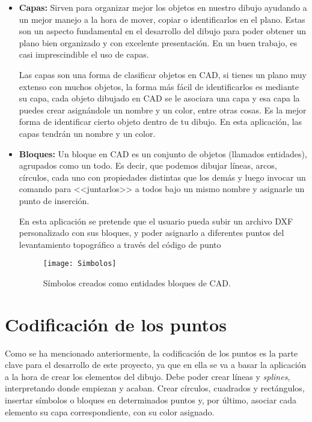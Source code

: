 \begin{itemize}

\item\textbf{Capas:} Sirven para organizar mejor los objetos en nuestro dibujo ayudando a un mejor manejo a la hora de mover, copiar o identificarlos en el plano. Estas son un aspecto fundamental en el desarrollo del dibujo para poder obtener un plano bien organizado y con excelente presentación. En un buen trabajo, es casi imprescindible el uso de capas.

Las capas son una forma de clasificar objetos en CAD, si tienes un plano muy extenso con muchos objetos, la forma más fácil de identificarlos es mediante su capa, cada objeto dibujado en CAD se le asociara una capa y esa capa la puedes crear asignándole un nombre y un color, entre otras cosas. Es la mejor forma de identificar cierto objeto dentro de tu dibujo.
En esta aplicación, las capas tendrán un nombre y un color.


\item\textbf{Bloques:} Un bloque en CAD es un conjunto de objetos (llamados entidades), agrupados como un todo. Es decir, que podemos dibujar líneas, arcos, círculos, cada uno con propiedades distintas que los demás y luego invocar un comando para <<juntarlos>> a todos bajo un mismo nombre y asignarle un punto de inserción.

En esta aplicación se pretende que el usuario pueda subir un archivo DXF personalizado con sus bloques, y poder asignarlo a diferentes puntos del levantamiento topográfico a través del código de punto


\begin{figure}[!h]
	\centering
	\texttt{[image: Simbolos]}
	\caption{Símbolos creados como entidades bloques de CAD.}
	\label{fig:Simbolos}
\end{figure}

\end{itemize}

\section{Codificación de los puntos}\label{sec:codificacion}

Como se ha mencionado anteriormente, la codificación de los puntos es la parte clave para el desarrollo de este proyecto, ya que en ella se va a basar la aplicación a la hora de crear los elementos del dibujo.
Debe poder crear líneas y \emph{splines}, interpretando donde empiezan y acaban. Crear círculos, cuadrados y rectángulos, insertar símbolos o bloques en determinados puntos y, por último, asociar cada elemento su capa correspondiente, con su color asignado.

